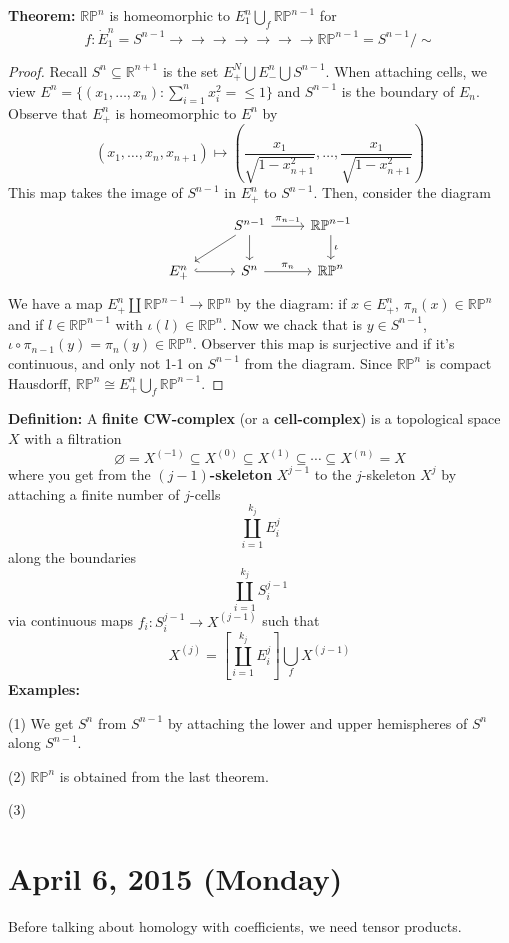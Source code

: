 \documentclass{article}
\begin{document}
\textbf{Theorem:} $\mathbb{RP}^n$ is homeomorphic to $E_1^n \bigcup_f \mathbb{RP}^{n-1}$ for 
\[
f: \dot{E}^n_1=S^{n-1} \to \to \to \to \to \to \to \mathbb{RP}^{n-1}=S^{n-1}/\sim
\]
\begin{proof}
Recall $S^n \subseteq \mathbb{R}^{n+1}$ is the set $E_+^N \bigcup E_-^n \bigcup S^{n-1}$. When attaching cells, we view $E^n = \{(x_1, \ldots, x_n) : \sum_{i=1}^n x_i^2 = \leq 1 \}$ and $S^{n-1}$ is the boundary of $E_n$. Observe that $E_{+}^n$ is homeomorphic to $E^n$ by 
\[
(x_1, \ldots, x_n, x_{n+1}) \mapsto \left(\frac{x_1}{\sqrt{1 - x_{n+1}^2}}, \ldots, \frac{x_1}{\sqrt{1 - x_{n+1}^2}}\right)
\]
This map takes the image of $S^{n-1}$ in $E_+^n$ to $S^{n-1}$. Then, consider the diagram
\[
\begin{tikzcd}
&S^{n-1} \arrow[r, "\pi_{n-1}"] \arrow[d] \arrow[ld]& \mathbb{RP}^{n-1} \arrow[d, "\iota"] \\
E^n_+ \arrow[r, hookrightarrow] & S^n \arrow[r,"\pi_n"] & \mathbb{RP}^n
\end{tikzcd}
\]
We have a map $E_+^n \coprod \mathbb{RP}^{n-1} \to \mathbb{RP}^n$ by the diagram: if $x \in E_+^n$, $\pi_n(x) \in \mathbb{RP}^n$ and if $l \in \mathbb{RP}^{n-1}$ with $\iota(l) \in \mathbb{RP}^n$. Now we chack that is $y \in S^{n-1}$, $\iota \circ \pi_{n-1}(y) = \pi_n(y) \in \mathbb{RP}^n$. Observer this map is surjective and if it's continuous, and only not 1-1 on $S^{n-1}$ from the diagram. Since $\mathbb{RP}^n$ is compact Hausdorff, $\mathbb{RP}^n \cong E^n_+ \bigcup_f \mathbb{RP}^{n-1}$.
\end{proof}

\textbf{Definition:} A \textbf{finite CW-complex} (or a \textbf{cell-complex}) is a topological space $X$ with a filtration
\[
\varnothing = X^{(-1)} \subseteq X^{(0)} \subseteq X^{(1)} \subseteq \cdots \subseteq X^{(n)} = X
\]
where you get from the \textbf{$(j-1)$-skeleton} $X^{j-1}$ to the $j$-skeleton $X^{j}$ by attaching a finite number of $j$-cells 
\[
\coprod_{i=1}^{k_j} E_i^j
\]
along the boundaries
\[
\coprod_{i=1}^{k_j} S_i^{j-1}
\]
via continuous maps $f_i: S_i^{j-1} \to X^{(j-1)}$ such that 
\[
X^{(j)} = \left[\coprod_{i=1}^{k_j}E_i^j \right] \bigcup_f X^{(j-1)}
\]
\textbf{Examples:}

(1) We get $S^n$ from $S^{n-1}$ by attaching the lower and upper hemispheres of $S^n$ along $S^{n-1}$.

(2) $\mathbb{RP}^n$ is obtained from the last theorem.

(3) 

\section{April 6, 2015 (Monday)}
Before talking about homology with coefficients, we need tensor products.
\end{document}
